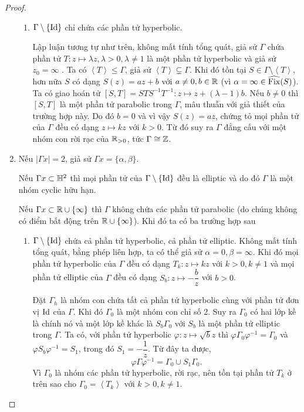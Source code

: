 \begin{proof}
\begin{enumerate}
\begin{enumerate}
            \item $\Gamma\setminus \{\operatorname{Id}\}$ chỉ chứa các phần tử hyperbolic.

            Lập luận tương tự như trên, không mất tính tổng quát, giả sử $\Gamma$ chứa phần tử $T:z \mapsto \lambda z, \lambda >0, \lambda \neq 1$ là một phần tử hyperbolic và giả sử $z_0 = \infty$ . Ta có $\left<T\right> \leq \Gamma$, giả  sử $\left<T\right> \subsetneq \Gamma$. Khi đó tồn tại $S \in \Gamma \setminus \left<T\right>$, hơn nữa $S$ có dạng $S(z) = az+b$ với $a \neq 0, b\in \mathbb{R}$ (vì $\alpha = \infty \in \widehat{\operatorname{Fix}}(S)$). Ta có giao hoán tử $[S,T] = STS^{-1}T^{-1}: z\mapsto z+(\lambda-1)b$. Nếu $b\neq 0$ thì $[S,T]$ là một phần tử parabolic trong $\Gamma$, mâu thuẫn với giả thiết của trường hợp này. Do đó $b = 0$ và vì vậy $S(z) = az$, chứng tỏ mọi phần tử của $\Gamma$ đều có dạng $z\mapsto kz$ với $ k>0$. Từ đó suy ra $\Gamma$ đẳng cấu với một nhóm con rời rạc của $\mathbb{R}_{>0}$, tức $\Gamma \cong \mathbb{Z}$.
        \end{enumerate}

        \item Nếu $|\Gamma x| = 2$, giả sử $\Gamma x= \{\alpha, \beta\}$.

        Nếu $\Gamma x\subset \mathbb{H}^2$ thì mọi phần tử của $\Gamma\setminus\{\operatorname{Id}\}$ đều là elliptic và do đó $\Gamma$ là một nhóm cyclic hữu hạn.

        Nếu $\Gamma x \subset \mathbb{R} \cup \{\infty\}$ thì $\Gamma$ không chứa các phần tử parabolic (do chúng không có điểm bất động trên $\mathbb{R} \cup \{\infty\}$). Khi đó ta có ba trường hợp sau
        \begin{enumerate}
            \item $\Gamma\setminus\{\operatorname{Id}\}$ chứa cả phần tử hyperbolic, cả phần tử elliptic. Không mất tính tổng quát, bằng phép liên hợp, ta có thể giả sử $\alpha = 0, \beta = \infty$. Khi đó mọi phần tử hyperbolic của $\Gamma$ đều có dạng $T_k: z\mapsto kz$ với $k>0, k \neq 1$ và mọi phần tử elliptic của $\Gamma$ đều có dạng $S_b: z \mapsto -\dfrac{b}{z}$ với $b>0$.

            Đặt $\Gamma_h $ là nhóm con chứa tất cả phần tử hyperbolic cùng với phần tử đơn vị $\operatorname{Id}$ của $\Gamma$. Khi đó $\Gamma_0$ là một nhóm con chỉ số 2. Suy ra $\Gamma_0$ có hai lớp kề là chính nó và một lớp kề khác là $S_b\Gamma_0$ với $S_b$ là một phần tử elliptic trong $\Gamma$. Ta có, với phần tử hyperbolic $\varphi: z\mapsto \sqrt{b}z$ thì $\varphi \Gamma_0 \varphi^{-1} = \Gamma_0$ và $\varphi S_b \varphi^{-1} = S_1$, trong đó $S_1 = -\dfrac{1}{z}$. Từ đây ta được,
            \[\varphi \Gamma \varphi^{-1} = \Gamma_0 \cup S_1\Gamma_0.\]
            Vì $\Gamma_0$ là nhóm các phần tử hyperbolic, rời rạc, nên tồn tại phần tử $T_k$ ở trên sao cho $\Gamma_0 = \left<T_k\right>$ với $k>0, k\neq 1$. 
            

\end{enumerate}
\end{enumerate}
\end{proof}
